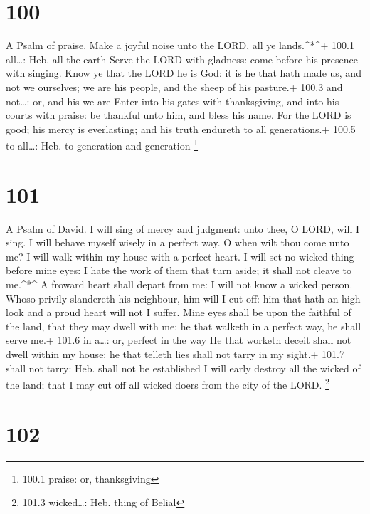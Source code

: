 \hypertarget{section-99}{%
\section{100}\label{section-99}}

A Psalm of praise.  Make a joyful noise unto the LORD, all
ye lands.\^{}*\^{}+ 100.1 all\ldots: Heb. all the earth 
Serve the LORD with gladness: come before his presence with singing.
 Know ye that the LORD he is God: it is he that hath made
us, and not we ourselves; we are his people, and the sheep of his
pasture.+ 100.3 and not\ldots: or, and his we are  Enter
into his gates with thanksgiving, and into his courts with praise: be
thankful unto him, and bless his name.  For the LORD is
good; his mercy is everlasting; and his truth endureth to all
generations.+ 100.5 to all\ldots: Heb. to generation and generation
\footnote{100.1 praise: or, thanksgiving}

\hypertarget{section-100}{%
\section{101}\label{section-100}}

A Psalm of David.  I will sing of mercy and judgment: unto
thee, O LORD, will I sing.  I will behave myself wisely in a
perfect way. O when wilt thou come unto me? I will walk within my house
with a perfect heart.  I will set no wicked thing before
mine eyes: I hate the work of them that turn aside; it shall not cleave
to me.\^{}*\^{}  A froward heart shall depart from me: I
will not know a wicked person.  Whoso privily slandereth his
neighbour, him will I cut off: him that hath an high look and a proud
heart will not I suffer.  Mine eyes shall be upon the
faithful of the land, that they may dwell with me: he that walketh in a
perfect way, he shall serve me.+ 101.6 in a\ldots: or, perfect in the
way  He that worketh deceit shall not dwell within my house:
he that telleth lies shall not tarry in my sight.+ 101.7 shall not
tarry: Heb. shall not be established  I will early destroy
all the wicked of the land; that I may cut off all wicked doers from the
city of the LORD. \footnote{101.3 wicked\ldots: Heb. thing of Belial}

\hypertarget{section-101}{%
\section{102}\label{section-101}}

